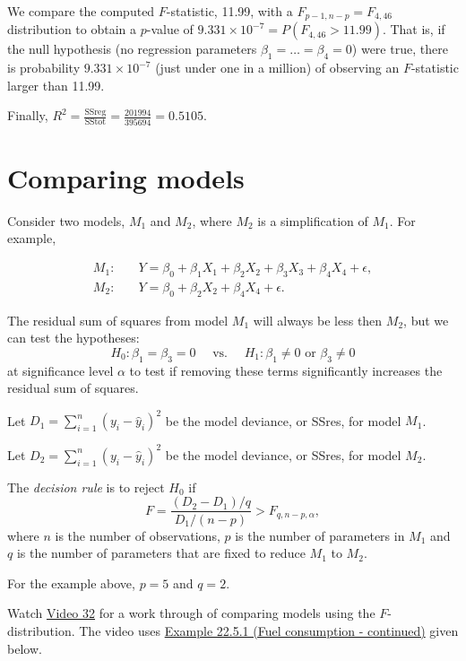 \documentclass[
]{book}
\begin{document}
We compare the computed \(F\)-statistic, 11.99, with a \(F_{p-1,n-p} =F_{4,46}\) distribution to obtain a \(p\)-value of \(9.331 \times 10^{-7} = P(F_{4,46} >11.99)\). That is, if the null hypothesis (no regression parameters \(\beta_1 = \ldots = \beta_4 =0\)) were true, there is probability \(9.331 \times 10^{-7}\) (just under one in a million) of observing an \(F\)-statistic larger than 11.99.

Finally, \(R^2 = \frac{\text{SSreg}}{\text{SStot}} = \frac{201994}{395694} = 0.5105\).

\hypertarget{Sec_Linear_ANOVA:Compare}{%
\section{Comparing models}\label{Sec_Linear_ANOVA:Compare}}

Consider two models, \(M_1\) and \(M_2\), where \(M_2\) is a simplification of \(M_1\). For example,

\begin{align*}
M_1: & \quad Y = \beta_0 + \beta_1 X_1 + \beta_2 X_2 + \beta_3 X_3 + \beta_4 X_4 + \epsilon, \\
M_2: & \quad Y = \beta_0 + \beta_2 X_2 + \beta_4 X_4 + \epsilon.
\end{align*}

The residual sum of squares from model \(M_1\) will always be less then \(M_2\), but we can test the hypotheses:
\[ H_0: \beta_1 = \beta_3 = 0 \quad \text{ vs. } \quad H_1: \beta_1 \neq 0 \text{ or } \beta_3 \neq 0 \]
at significance level \(\alpha\) to test if removing these terms significantly increases the residual sum of squares.

Let \(D_1 = \sum\limits_{i=1}^n (y_i - \hat{y}_i)^2\) be the model deviance, or SSres, for model \(M_1\).

Let \(D_2 = \sum\limits_{i=1}^n (y_i - \hat{y}_i)^2\) be the model deviance, or SSres, for model \(M_2\).

The \emph{decision rule} is to reject \(H_0\) if
\[ F = \frac{(D_2 - D_1) / q}{D_1 / (n-p)} > F_{q,n-p,\alpha},\]
where \(n\) is the number of observations, \(p\) is the number of parameters in \(M_1\) and \(q\) is the number of parameters that are fixed to reduce \(M_1\) to \(M_2\).

For the example above, \(p = 5\) and \(q = 2\).

Watch \protect\hyperlink{video32}{Video 32} for a work through of comparing models using the \(F\)-distribution. The video uses \protect\hyperlink{Sec_Linear_ANOVA:ex:fuel_exII}{Example 22.5.1 (Fuel consumption - continued)} given below.
\end{document}
